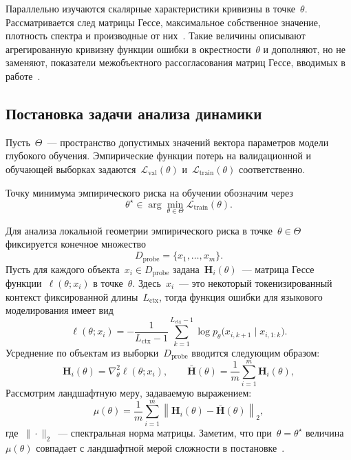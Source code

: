 Параллельно изучаются скалярные характеристики кривизны в точке~$\theta$. Рассматривается след матрицы Гессе, максимальное собственное значение, плотность спектра и производные от них~\cite{pmlr-v97-ghorbani19b, papyan2019spectrumdeepnethessiansscale, wu2022dissecting, petrov2025curvaturegap}.
Такие величины описывают агрегированную кривизну функции ошибки в окрестности~$\theta$ и дополняют, но не заменяют, показатели межобъектного рассогласования матриц Гессе, вводимых в работе~\cite{grabovoi2024unraveling748584228}.

\subsection{Постановка задачи анализа динамики}\label{ch1emp:sec:problem}

Пусть~$\Theta$~--- пространство допустимых значений вектора параметров модели глубокого обучения.
Эмпирические функции потерь на валидационной и обучающей выборках задаются~$\mathcal{L}_{\mathrm{val}}(\theta)$ и~$\mathcal{L}_{\mathrm{train}}(\theta)$ соответственно.

Точку минимума эмпирического риска на обучении обозначим через
\begin{equation}
  \theta^\star \in \arg\min_{\theta\in\Theta} \mathcal{L}_{\mathrm{train}}(\theta).
\end{equation}

Для анализа локальной геометрии эмпирического риска в точке~$\theta\in\Theta$ фиксируется конечное множество
\[
  D_{\mathrm{probe}} = \{x_1,\ldots,x_m\}.
\]
Пусть для каждого объекта~$x_i\in D_{\mathrm{probe}}$ задана~$\mathbf{H}_i(\theta)$~--- матрица Гессе функции~$\ell(\theta;x_i)$ в точке~$\theta$.
Здесь~$x_i$~--- это некоторый токенизированный контекст фиксированной длины~$L_{\mathrm{ctx}}$, тогда функция ошибки для языкового моделирования имеет вид
\[
  \ell(\theta;x_i)= -\frac{1}{L_{\mathrm{ctx}}-1}\sum_{k=1}^{L_{\mathrm{ctx}}-1}\log p_\theta\bigl(x_{i,k+1}\mid x_{i,1:k}\bigr).
\]
Усреднение по объектам из выборки~$D_{\mathrm{probe}}$ вводится следующим образом:
\begin{equation}\label{ch1emp:eq:probe-hessians}
  \mathbf{H}_i(\theta)=\nabla_\theta^2 \ell(\theta;x_i), \qquad
  \bar{\mathbf{H}}(\theta)=\frac{1}{m}\sum_{i=1}^{m}\mathbf{H}_i(\theta),
\end{equation}
Рассмотрим ландшафтную меру, задаваемую выражением:
\begin{equation}\label{ch1emp:eq:mu-def}
  \mu(\theta)=\frac{1}{m}\sum_{i=1}^{m}\left\|\mathbf{H}_i(\theta)-\bar{\mathbf{H}}(\theta)\right\|_2,
\end{equation}
где~$\|\cdot\|_2$~--- спектральная норма матрицы.
Заметим, что при~$\theta=\theta^\star$ величина~$\mu(\theta)$ совпадает с ландшафтной мерой сложности в постановке~\cite{grabovoi2024unraveling748584228}.


